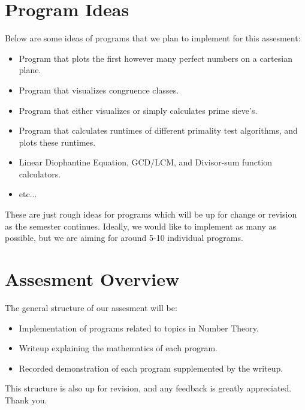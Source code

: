 \documentclass[11pt]{article}
\begin{document}
\section*{Program Ideas}
Below are some ideas of programs that we plan to implement for this assesment:
\begin{itemize}
\item Program that plots the first however many perfect numbers on a cartesian plane.
\item Program that visualizes congruence classes.
\item Program that either visualizes or simply calculates prime sieve's.
\item Program that calculates runtimes of different primality test algorithms, and plots these runtimes.
\item Linear Diophantine Equation, GCD/LCM, and Divisor-sum function calculators.
\item etc...
\end{itemize}
These are just rough ideas for programs which will be up for change or revision as the semester continues.
Ideally, we would like to implement as many as possible, but we are aiming for around 5-10 individual programs.
\section*{Assesment Overview}
The general structure of our assesment will be:
\begin{itemize}
\item Implementation of programs related to topics in Number Theory.
\item Writeup explaining the mathematics of each program.
\item Recorded demonstration of each program supplemented by the writeup.
\end{itemize}
This structure is also up for revision, and any feedback is greatly appreciated. Thank you.
\end{document}
